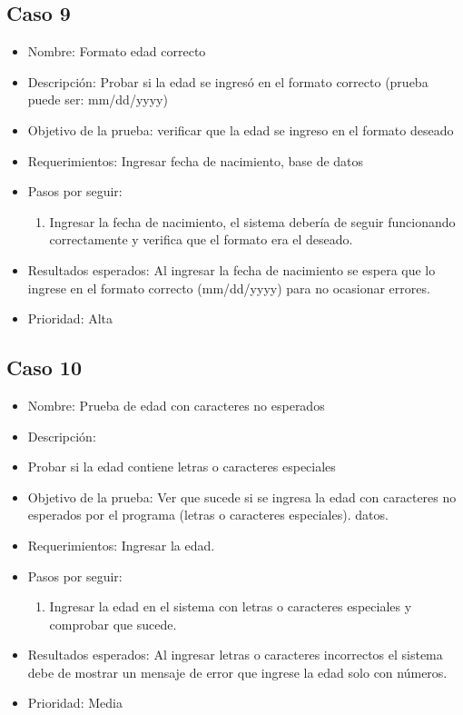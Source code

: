 \documentclass[conference]{IEEEtran}
\begin{document}
\subsection{Caso 9}
\begin{itemize}
\item Nombre: Formato edad correcto 
\item Descripción: Probar si la edad se ingresó en el formato correcto (prueba puede ser: mm/dd/yyyy)
\item Objetivo de la prueba: verificar que la edad se ingreso en el formato deseado 
\item Requerimientos: Ingresar fecha de nacimiento, base de datos 
\item Pasos por seguir: 
\begin{enumerate}
\item Ingresar la fecha de nacimiento, el sistema debería de seguir funcionando correctamente y verifica que el formato era el deseado.
\end{enumerate}
\item Resultados esperados: Al ingresar la fecha de nacimiento se espera que lo ingrese en el formato correcto (mm/dd/yyyy) para no ocasionar errores.
\item Prioridad: Alta
\end{itemize}

\subsection{Caso 10}
\begin{itemize}
\item Nombre: Prueba de edad con caracteres no esperados 
\item Descripción: \item Probar si la edad contiene letras o caracteres especiales
\item Objetivo de la prueba: Ver que sucede si se ingresa la edad con caracteres no esperados por el programa (letras o caracteres especiales).
datos.
\item Requerimientos: Ingresar la edad. 
\item Pasos por seguir: 
\begin{enumerate}
\item Ingresar la edad en el sistema con letras o caracteres especiales y comprobar que sucede.
\end{enumerate}
\item Resultados esperados: Al ingresar letras o caracteres incorrectos el sistema debe de mostrar un mensaje de error que ingrese la edad solo con números.
\item Prioridad: Media
\end{itemize}
\end{document}
